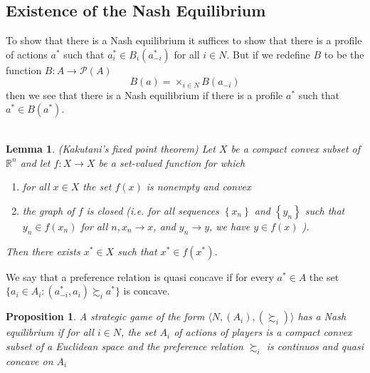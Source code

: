 \documentclass{tufte-handout}
\newtheorem{prop}[thm]{Proposition}
\newtheorem{lem}[thm]{Lemma}
\theoremstyle{definition}
\theoremstyle{remark}
\begin{document}
\subsection{Existence of the Nash Equilibrium}
To show that there is a Nash equilibrium it suffices to show that there is a profile of actions $a^*$ such that $a_i^*\in B_i(a_{-i}^*)$ for all $i\in N$. But if we redefine $B$ to be the function $B:A\rightarrow \mathcal{P}(A)$
$$
B(a) =\times_{i\in N}B(a_{-i})
$$
then we see that there is a Nash equilibrium if there is a profile $a^*$ such that $a^*\in B(a^*)$.
\\\\
\begin{lem}
    (Kakutani's fixed point theorem) Let $X$ be a compact convex subset of $\mathbb{R}^n$ and let $f: X \rightarrow X$ be a set-valued function for which
 \begin{enumerate}
    \item for all $x \in X$ the set $f(x)$ is nonempty and convex
    
    \item the graph of $f$ is closed (i.e. for all sequences $\left\{x_n\right\}$ and $\left\{y_n\right\}$ such that $y_n \in f\left(x_n\right)$ for all $n, x_n \rightarrow x$, and $y_n \rightarrow y$, we have $y \in f(x)$ ).
 \end{enumerate}
Then there exists $x^* \in X$ such that $x^* \in f\left(x^*\right)$.
\end{lem}
We say that a preference relation is quasi concave if for every $a^*\in A$ the set $\{a_i \in A_i: (a_{-i}^*, a_i)\succsim_i a^*\}$
is concave. 
\begin{prop}
    A strategic game of the form $\langle N, (A_i), (\succsim_i)\rangle$ has a Nash equilibrium if for all $i\in N$, the set $A_i$ of actions of players is a compact convex subset of a Euclidean space and the preference relation $\succsim_i$ is continuos and quasi concave on $A_i$
\end{prop}
\end{document}
